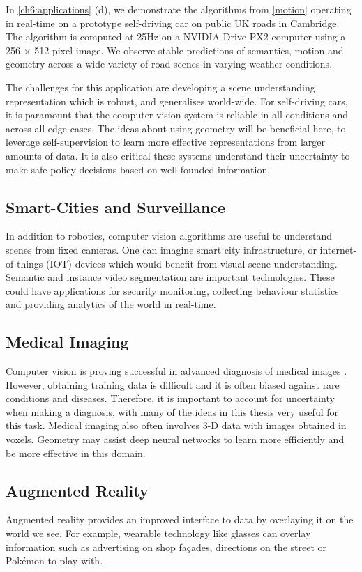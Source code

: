 In \cref{ch6:applications} (d), we demonstrate the algorithms from \cref{motion} operating in real-time on a prototype self-driving car on public UK roads in Cambridge. The algorithm is computed at 25Hz on a NVIDIA Drive PX2 computer using a 256 $\times$ 512 pixel image. We observe stable predictions of semantics, motion and geometry across a wide variety of road scenes in varying weather conditions.

The challenges for this application are developing a scene understanding representation which is robust, and generalises world-wide. For self-driving cars, it is paramount that the computer vision system is reliable in all conditions and across all edge-cases. The ideas about using geometry will be beneficial here, to leverage self-supervision to learn more effective representations from larger amounts of data. It is also critical these systems understand their uncertainty to make safe policy decisions based on well-founded information.

\subsection{Smart-Cities and Surveillance}
In addition to robotics, computer vision algorithms are useful to understand scenes from fixed cameras. One can imagine smart city infrastructure, or internet-of-things (IOT) devices which would benefit from visual scene understanding. Semantic and instance video segmentation are important technologies. These could have applications for security monitoring, collecting behaviour statistics and providing analytics of the world in real-time.

\subsection{Medical Imaging}
Computer vision is proving successful in advanced diagnosis of medical images \citep{ronneberger2015u}. However, obtaining training data is difficult and it is often biased against rare conditions and diseases. Therefore, it is important to account for uncertainty when making a diagnosis, with many of the ideas in this thesis very useful for this task. Medical imaging also often involves 3-D data with images obtained in voxels. Geometry may assist deep neural networks to learn more efficiently and be more effective in this domain.

\subsection{Augmented Reality}
Augmented reality provides an improved interface to data by overlaying it on the world we see. For example, wearable technology like glasses can overlay information such as advertising on shop façades, directions on the street or Pokémon to play with.

